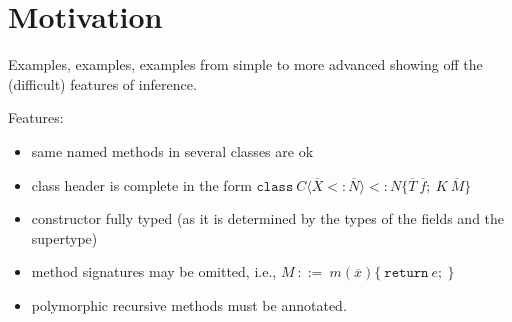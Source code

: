 \section{Motivation}
\label{sec:motivation}

Examples, examples, examples from simple to more advanced showing off
the (difficult) features of inference.

Features:
\begin{itemize}
\item same named methods in several classes are ok
\item class header is complete in the form
  $\mathtt{class}\ C\langle\overline X <: \overline N\rangle <: N \{
  \overline T\ \overline f;\ K\ \overline M \}$
\item constructor fully typed (as it is determined by the types of the
  fields and the supertype)
\item method signatures may be omitted, i.e., 
  $M\ ::=\ m(\overline x) \{ \ \mathtt{return}\ e;\ \}$
\item polymorphic recursive methods must be annotated.
\end{itemize}

